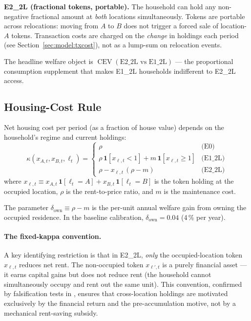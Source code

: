 \noindent\textbf{E2\_2L (fractional tokens, portable).}  The household can
hold any non-negative fractional amount at \emph{both} locations simultaneously.
Tokens are portable across relocations: moving from $A$ to $B$ does not
trigger a forced sale of location-$A$ tokens.  Transaction costs are charged
on the \emph{change} in holdings each period (see Section~\ref{sec:model:txcost}),
not as a lump-sum on relocation events.

The headline welfare object is $\operatorname{CEV}(\text{E2\_2L vs E1\_2L})$
--- the proportional consumption supplement that makes E1\_2L households
indifferent to E2\_2L access.

\subsection{Housing-Cost Rule}
\label{sec:model:kappa}

Net housing cost per period (as a fraction of house value) depends on the
household's regime and current holdings:
\begin{equation}
    \kappa(x_{A,t}, x_{B,t}, \ell_t) = \begin{cases}
        \rho                           & \text{(E0)} \\[4pt]
        \rho\,\mathbf{1}[x_{\ell,t} < 1]
        + m\,\mathbf{1}[x_{\ell,t} \geq 1]  & \text{(E1\_2L)} \\[4pt]
        \rho - x_{\ell,t}\,(\rho - m) & \text{(E2\_2L)}
    \end{cases}
    \label{eq:kappa}
\end{equation}
where $x_{\ell,t} \equiv x_{A,t}\,\mathbf{1}[\ell_t = A] + x_{B,t}\,\mathbf{1}[\ell_t = B]$
is the token holding at the occupied location, $\rho$ is the rent-to-price
ratio, and $m$ is the maintenance cost.

The parameter $\delta_{\text{own}} \equiv \rho - m$ is the per-unit annual
welfare gain from owning the occupied residence.  In the baseline calibration,
$\delta_{\text{own}} = 0.04$ (4\,\% per year).

\paragraph{The fixed-kappa convention.}
A key identifying restriction is that in E2\_2L, \emph{only} the
occupied-location token $x_{\ell,t}$ reduces net rent.  The non-occupied
token $x_{\ell',t}$ is a purely financial asset — it earns capital gains
but does not reduce rent (the household cannot simultaneously occupy and
rent out the same unit).  This convention, confirmed by falsification
tests in \citet{researchLogMay01}, ensures that cross-location holdings
are motivated exclusively by the financial return and the pre-accumulation
motive, not by a mechanical rent-saving subsidy.

